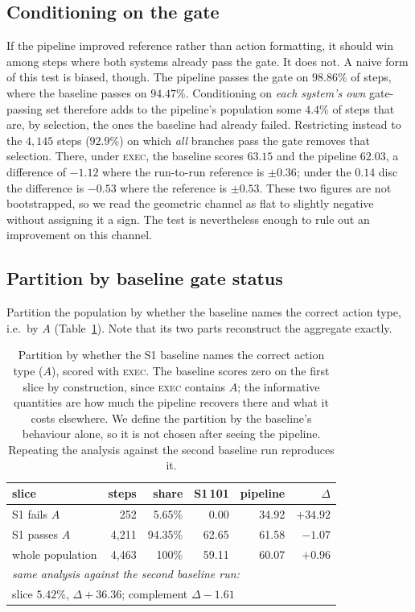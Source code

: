 \documentclass[runningheads,a4paper]{llncs}
\newcommand{\rulename}[1]{\textsc{#1}}
\begin{document}
\subsection{Conditioning on the gate}
If the pipeline improved reference rather than action formatting, it should win among steps where
both systems already pass the gate. It does not. A naive form of this test is biased, though. The
pipeline passes the gate on $98.86\%$ of steps, where the baseline passes on $94.47\%$. Conditioning on
\emph{each system's own} gate-passing set therefore adds to the pipeline's population some $4.4\%$
of steps that are, by selection, the ones the baseline had already failed. Restricting instead to the
$4{,}145$ steps ($92.9\%$) on which \emph{all} branches pass the gate removes that selection.
There, under \rulename{exec}, the baseline scores $63.15$ and the pipeline $62.03$, a
difference of $-1.12$ where the run-to-run reference is $\pm 0.36$; under the $0.14$ disc the
difference is $-0.53$ where the reference is $\pm 0.53$. These two figures are not
bootstrapped, so we read the geometric channel as flat to slightly negative without assigning it
a sign. The test is nevertheless enough to rule out an improvement on this channel.

\subsection{Partition by baseline gate status}
Partition the population by whether the baseline names the correct action type, i.e.\ by $A$
(Table~\ref{tab:slice}).
Note that its two parts reconstruct the aggregate exactly.

\begin{table}[t]
\centering
\caption{Partition by whether the S1 baseline names the correct action type ($A$), scored with
\rulename{exec}.
The baseline scores zero on the first slice by construction, since \rulename{exec} contains
$A$; the informative quantities are how much the pipeline recovers there and what it costs
elsewhere. We define the partition by the baseline's behaviour alone, so it is not chosen after
seeing the pipeline. Repeating the analysis against the second baseline run reproduces it.}
\label{tab:slice}
\small
\begin{tabular}{lrrrrr}
\toprule
slice & steps & share & S1\,101 & pipeline & $\Delta$\\
\midrule
S1 fails $A$      & \phantom{0,}252 & \phantom{0}5.65\% & \phantom{0}0.00 &
34.92 & $+34.92$\\
S1 passes $A$     & 4{,}211 & 94.35\% & 62.65 & 61.58 & $-1.07$\\
\midrule
whole population              & 4{,}463 & 100\% & 59.11 & 60.07 & $+0.96$\\
\midrule
\multicolumn{6}{l}{\emph{same analysis against the second baseline run:}}\\
\multicolumn{6}{l}{\quad slice $5.42\%$, $\Delta +36.36$; complement $\Delta -1.61$}\\
\bottomrule
\end{tabular}
\end{table}
\end{document}

